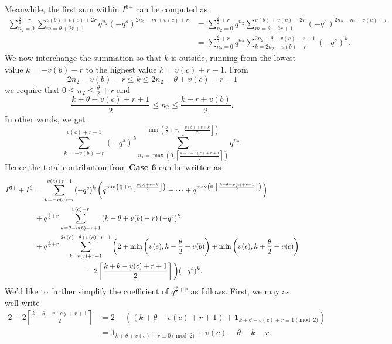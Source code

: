 Meanwhile, the first sum within $I^{\text{6+}}$ can be computed as
\begin{align*}
  \sum_{n_2 = 0}^{\frac{\theta}{2} + r}
  \sum_{m = \theta + 2r + 1}^{v(b) + v(c) + 2r}
    q^{n_2} (-q^s)^{2n_2 - m + v(c) + r}
  &= \sum_{n_2 = 0}^{\frac{\theta}{2} + r} q^{n_2}
    \sum_{m = \theta + 2r + 1}^{v(b) + v(c) + 2r}
      (-q^s)^{2n_2 - m + v(c) + r} \\
  &= \sum_{n_2 = 0}^{\frac{\theta}{2} + r} q^{n_2}
    \sum_{k = 2n_2 - v(b) - r}^{2n_2 - \theta + v(c) - r - 1} (-q^s)^k.
\end{align*}
We now interchange the summation so that $k$ is outside,
running from the lowest value $k = -v(b) - r$
to the highest value $k = v(c) + r - 1$.
From
\[ 2n_2 - v(b) - r \le k \le 2n_2 - \theta + v(c) - r - 1 \]
we require that $0 \le n_2 \le \frac{\theta}{2} + r$ and
\[ \frac{k + \theta - v(c) + r + 1}{2} \le n_2 \le \frac{k + r + v(b)}{2}. \]
In other words, we get
\[
  \sum_{k = - v(b) - r}^{v(c) + r - 1}
  (-q^s)^k
  \sum_{n_2 = \max\left(0, \left\lceil \frac{k + \theta - v(c) + r + 1}{2} \right\rceil \right)}
  ^{\min\left( \frac{\theta}{2} + r, \left\lfloor \frac{v(b) + r + k}{2} \right\rfloor \right) } q^{n_2}.
\]
Hence the total contribution from \textbf{Case 6} can be written as
\begin{align*}
  I^{\text{6+}} + I^{\text{6-}}
  &=
  \sum_{k = - v(b) - r}^{v(c) + r - 1} (-q^s)^k \left(
    q^{\min\left( \frac{\theta}{2} + r, \left\lfloor \frac{v(b) + r + k}{2} \right\rfloor \right)}
    + \dots
    + q^{\max\left(0, \left\lceil \frac{k + \theta - v(c) + r + 1}{2} \right\rceil \right)}
    \right) \\
  &+ q^{\frac{\theta}{2} + r}
  \sum_{k = \theta - v(b) + r + 1}^{v(c) + r}
  \left( k - \theta + v(b) - r \right) (-q^s)^k \\
  &+ q^{\frac{\theta}{2} + r}
  \sum_{k = v(c) + r + 1}^{2v(e) - \theta + v(c) - r - 1}
  \bigg( 2 +
    \min\left( v(e), k - \frac{\theta}{2} + v(b) \right)
    + \min\left( v(e), k + \frac{\theta}{2} - v(c) \right) \\
    &\hspace{16ex} - 2\left\lceil \frac{k + \theta - v(c) + r + 1}{2} \right\rceil \bigg) (-q^s)^k.
\end{align*}
We'd like to further simplify the coefficient of $q^{\frac{\theta}{2}+r}$ as follows.
First, we may as well write
\begin{align*}
  2 - 2\left\lceil \frac{k + \theta - v(c) + r + 1}{2} \right\rceil
  &= 2 - \left( (k + \theta - v(c) + r + 1)
  + \mathbf{1}_{k + \theta + v(c) + r \equiv 1 \pmod 2} \right) \\
  &= \mathbf{1}_{k + \theta + v(c) + r \equiv 0 \pmod 2}
  + v(c) - \theta - k - r.
\end{align*}
